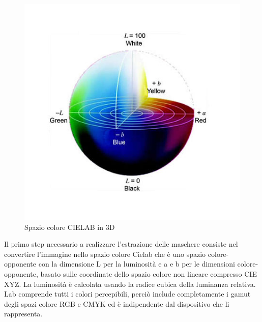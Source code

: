 \documentclass[a4paper,12pt]{report}
\begin{document}
\begin{figure}
\begin{minipage}{0.35\textwidth}
          \includegraphics[width=\textwidth]{assets/images/methods/porting/cielab/cielab1.jpg}   
          \caption{Spazio colore CIELAB in 3D}
        \end{minipage}
      \end{figure}

      Il primo step necessario a realizzare l'estrazione delle maschere consiste nel convertire l'immagine nello spazio colore Cielab che è uno spazio colore-opponente con la dimensione L per la luminosità e a e b per le dimensioni colore-opponente,
      basato sulle coordinate dello spazio colore non lineare compresso CIE XYZ.
      La luminosità è calcolata usando la radice cubica della luminanza relativa. 
      Lab comprende tutti i colori percepibili, perciò include completamente i gamut degli 
      spazi colore RGB e CMYK ed è indipendente dal dispositivo che li rappresenta.
      
\end{document}
